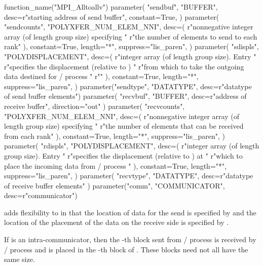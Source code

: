 \begin{mpi-binding}
    function_name("MPI_Alltoallv")
    parameter(
        "sendbuf",
        "BUFFER",
        desc=r"starting address of send buffer",
        constant=True,
    )
    parameter(
        "sendcounts",
        "POLYXFER_NUM_ELEM_NNI",
        desc=(
            r"nonnegative integer array (of length group size) specifying "
            r"the number of elements to send to each rank"
        ),
        constant=True,
        length="*",
        suppress="lis_paren",
    )
    parameter(
        "sdispls",
        "POLYDISPLACEMENT",
        desc=(
            r"integer array (of length group size). Entry  "
            r"specifies the displacement (relative to ) "
            r"from which to take the outgoing data destined for \MPI/ process "
            r""
        ),
        constant=True,
        length="*",
        suppress="lis_paren",
    )
    parameter("sendtype", "DATATYPE", desc=r"datatype of send buffer elements")
    parameter(
        "recvbuf", "BUFFER", desc=r"address of receive buffer", direction="out"
    )
    parameter(
        "recvcounts",
        "POLYXFER_NUM_ELEM_NNI",
        desc=(
            r"nonnegative integer array (of length group size) specifying "
            r"the number of elements that can be received from each rank"
        ),
        constant=True,
        length="*",
        suppress="lis_paren",
    )
    parameter(
        "rdispls",
        "POLYDISPLACEMENT",
        desc=(
            r"integer array (of length group size). Entry  "
            r"specifies the displacement (relative to ) at "
            r"which to place the incoming data from \MPI/ process "
        ),
        constant=True,
        length="*",
        suppress="lis_paren",
    )
    parameter(
        "recvtype", "DATATYPE", desc=r"datatype of receive buffer elements"
    )
    parameter("comm", "COMMUNICATOR", desc=r"communicator")
\end{mpi-binding}

 adds flexibility to  in that
the location of data for the send is specified by 
and the location of the placement of the data on the receive side
is specified by .

If  is an intra-communicator, then
the
-th
block sent from \MPI/ process  is received by \MPI/ process 
and is placed in the
-th
block of .  These blocks need not all have the same size.

